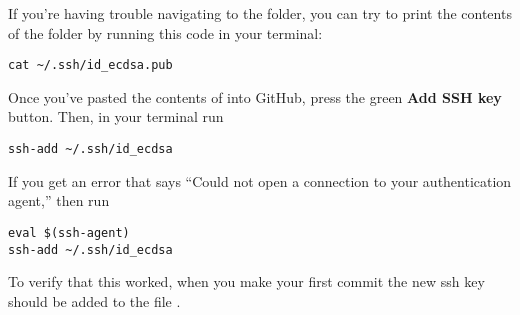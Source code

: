 \begin{enumerate}
    If you're having trouble navigating to the  folder, you can try to print the contents of the folder by running this code in your terminal:
\begin{lstlisting}
cat ~/.ssh/id_ecdsa.pub 
\end{lstlisting}
    Once you've pasted the contents of  into GitHub, press the green \textbf{Add SSH key} button.
    Then, in your terminal run 
\begin{lstlisting}
ssh-add ~/.ssh/id_ecdsa 
\end{lstlisting}
    If you get an error that says ``Could not open a connection to your authentication agent,'' then run 
\begin{lstlisting}
eval $(ssh-agent)
ssh-add ~/.ssh/id_ecdsa 
\end{lstlisting}

    To verify that this worked, when you make your first commit the new ssh key should be added to the file .
  
  

\end{enumerate}
